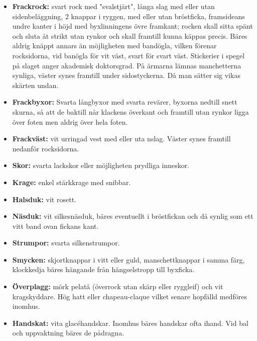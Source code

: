     \begin{itemize}
    
    \item[]\textbf{Frackrock:} svart rock med "svalstjärt", långa slag med eller utan sidenbeläggning, 2 knappar i ryggen, med eller utan bröstficka, framsideans undre kanter i höjd med byxlinningens övre framkant; rocken skall sitta spänt och sluta åt strikt utan rynkor och skall framtill kunna käppas precis. Bäres aldrig knäppt annars än möjligheten med bandögla, vilken förenar rocksidorna, vid banögla för vit väst, svart för svart väst. Stickerier i spegel på slaget anger akademisk doktorsgrad. På ärmarna lämnas manchetterna synliga, väster synes framtill under sidostyckerna. Då man sätter sig vikas skärten undan.

    \item[]\textbf{Frackbyxor:} Svarta långbyxor med svarta revärer, byxorna nedtill snett skurna, så att de baktill når klackens överkant och framtill utan rynkor ligga över foten men aldrig över hela foten.

    \item[]\textbf{Frackväst:} vit urringad vest med eller uta nslag. Väster synes framtill nedanför rocksidorna.

    \item[]\textbf{Skor:} svarta lackskor eller möjligheten prydliga inneskor.

    \item[]\textbf{Krage:} enkel stärkkrage med snibbar.

    \item[]\textbf{Halsduk:} vit rosett.

    \item[]\textbf{Näsduk:} vit silkesnäsduk, bäres eventuellt i bröstfickan och då synlig som ett vitt band ovan fickans kant.

    \item[]\textbf{Strumpor:} svarta silkenstrumpor.

    \item[]\textbf{Smycken:} skjortknappar i vitt eller guld, manschettknappar i samma färg, klockkedja bäres hängande från hängselstropp till byxficka.

    \item[]\textbf{Överplagg:} mörk pelatå (överrock utan skärp eller ryggleif) och vit kragskyddare. Hög hatt eller chapeau-claque vilket senare hopfälld medföres inomhus.

    \item[]\textbf{Handskat:} vita glacéhandskar. Inomhus bäres handskar ofta ihand. Vid bal och uppvaktning bäres de pådragna.

    \end{itemize}

